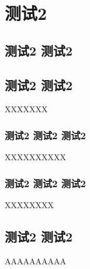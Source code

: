\chapter{测试2 }
\section{测试2 测试2 }
\section{测试2 测试2 }
XXXXXXX
\subsection{测试2 测试2 测试2 }
XXXXXXXXXX
\subsection{测试2 测试2 测试2 }
XXXXXXXX
\section{测试2 测试2 }
AAAAAAAAAA
\endinput